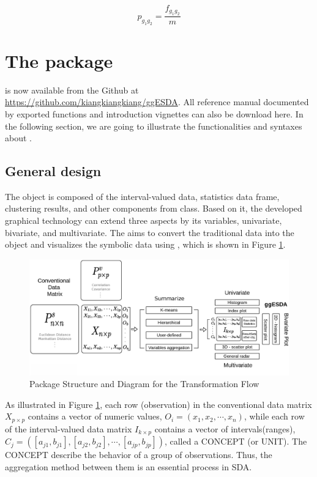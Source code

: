 \documentclass[article]{jss}
\begin{document}
\begin{equation}\label{eq:bi_rel_fg}
p_{g_1g_2} = \frac{f_{g_1g_2}}{m}
\end{equation}



\section[The ggESDA package]{The  package}

 is now available from the Github at \url{https://github.com/kiangkiangkiang/ggESDA}. All reference manual documented by exported functions and introduction vignettes can also be download here. In the following section, we are going to illustrate the functionalities and syntaxes about .
 
\subsection{General design}

The  object is composed of the interval-valued data, statistics data frame, clustering results, and other components from  class. Based on it, the developed graphical technology can extend three aspects by its variables, univariate, bivariate, and multivariate. The  aims to convert the traditional data into the  object and visualizes the symbolic data using , which is shown in Figure \ref{fig:pkgStr}.

\begin{figure}[h]	
  		\centering	 			 	
 	 		\includegraphics[width=1\textwidth]{doc/packageStructure2.eps} 
  		\caption{Package Structure and Diagram for the Transformation Flow} 
  		\label{fig:pkgStr}   			 		 
\end{figure}

As illustrated in Figure \ref{fig:pkgStr}, each row (observation) in the conventional data matrix $X_{p \times p}$ contains a vector of numeric values, $O_i = (x_1,x_2,\cdots,x_n)$, while each row of the interval-valued data matrix $I_{k \times p}$ contains a vector of intervals(ranges), $C_j = ([a_{j1},b_{j1}],[a_{j2},b_{j2}],\cdots,[a_{jp},b_{jp}])$, called a CONCEPT (or UNIT). The CONCEPT describe the behavior of a group of observations. Thus, the aggregation method between them is an essential process in SDA.
\end{document}
